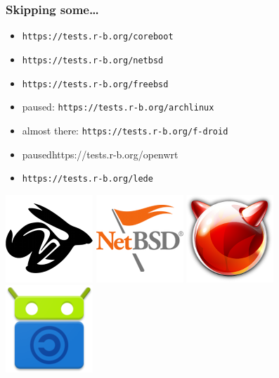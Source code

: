 \documentclass[14pt,aspectratio=169]{beamer}
\newif\ifplacelogo
\begin{document}
\placelogofalse

\begin{frame}
 \frametitle{Skipping some…}
 \begin{itemize}
  \item \texttt{https://tests.r-b.org/coreboot}
  \item \texttt{https://tests.r-b.org/netbsd}
  \item \texttt{https://tests.r-b.org/freebsd}
  \item paused: \texttt{https://tests.r-b.org/archlinux}
  \item almost there: \texttt{https://tests.r-b.org/f-droid}
  \item paused{https://tests.r-b.org/openwrt}
  \item \texttt{https://tests.r-b.org/lede}
 \end{itemize}
 \begin{center}
  \includegraphics[height=0.13\paperheight]{images/coreboot.png}
  \hspace{0.05\paperwidth}
  \includegraphics[height=0.13\paperheight]{images/netbsd.png}
  \hspace{0.05\paperwidth}
  \includegraphics[height=0.13\paperheight]{images/freebsd.png}
  \hspace{0.05\paperwidth}
  \includegraphics[height=0.13\paperheight]{images/f-droid.png}

\end{center}
\end{frame}
\end{document}
